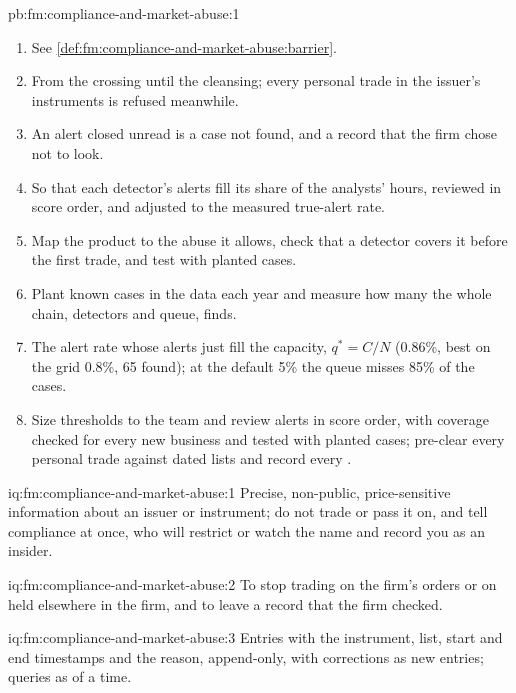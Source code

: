 \begin{solution}{pb:fm:compliance-and-market-abuse:1}
\begin{enumerate}
\item See \cref{def:fm:compliance-and-market-abuse:barrier}.
\item From the crossing until the cleansing; every personal trade in the issuer's instruments is refused meanwhile.
\item An alert closed unread is a case not found, and a record that the firm chose not to look.
\item So that each detector's alerts fill its share of the analysts' hours, reviewed in score order, and adjusted to the measured true-alert rate.
\item Map the product to the abuse it allows, check that a detector covers it before the first trade, and test with planted cases.
\item Plant known cases in the data each year and measure how many the whole chain, detectors and queue, finds.
\item The alert rate whose alerts just fill the capacity, $q^*=C/N$ (0.86\%, best on the grid 0.8\%, 65 found); at the default 5\% the queue misses
85\% of the cases.
\item Size thresholds to the team and review alerts in score order, with coverage checked for every new business and tested with planted cases;
pre-clear every personal trade against dated lists and record every .
\end{enumerate}
\end{solution}

\begin{solution}{iq:fm:compliance-and-market-abuse:1}
Precise, non-public, price-sensitive information about an issuer or instrument; do not trade or pass it on, and tell compliance at once, who will
restrict or watch the name and record you as an insider.
\end{solution}

\begin{solution}{iq:fm:compliance-and-market-abuse:2}
To stop trading on the firm's orders or on  held elsewhere in the firm, and to leave a record that the firm checked.
\end{solution}

\begin{solution}{iq:fm:compliance-and-market-abuse:3}
Entries with the instrument, list, start and end timestamps and the reason, append-only, with corrections as new entries; queries as of a time.
\end{solution}

